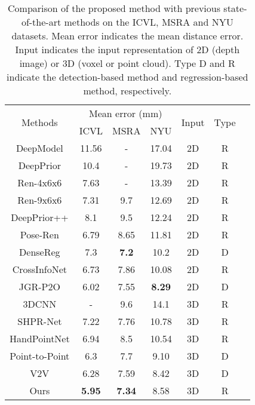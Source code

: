 \documentclass[10pt,twocolumn,letterpaper]{article}
\begin{document}
\begin{table}[h!]
\setlength\tabcolsep{5pt}\small
\begin{center}

\begin{tabular}{ccccccc}
\hline
\multirow{2}{*}{Methods} & \multicolumn{3}{c}{Mean error (mm)}& \multirow{2}{*}{Input}& \multirow{2}{*}{Type} \\
\cline{2-4}
                        & ICVL          &   MSRA        &   NYU     &   \\
\hline

DeepModel \cite{zhou2016model}       &11.56          & -            & 17.04             &2D   &R  \\
DeepPrior \cite{oberweger2015hands}  &10.4           & -            & 19.73             &2D   &R  \\
Ren-4x6x6 \cite{guo2017region}       &7.63           & -            & 13.39            &2D   &R  \\
Ren-9x6x6 \cite{wan2018dense}        &7.31           & 9.7          & 12.69           &2D   &R  \\
DeepPrior++ \cite{oberweger2017deepprior++}          &8.1           & 9.5           & 12.24           &2D   &R  \\
Pose-Ren \cite{chen2020pose}         &6.79           & 8.65         & 11.81         &2D   &R  \\
DenseReg \cite{wan2018dense}         &7.3            & \textbf{7.2} & 10.2 &2D   &D  \\
CrossInfoNet \cite{du2019crossinfonet}&6.73          & 7.86         & 10.08          &2D   &R  \\
JGR-P2O \cite{fang2020jgr}           &6.02           & 7.55         & \textbf{8.29}          &2D   &D  \\
\hline
3DCNN \cite{ge20173d}                & -             &9.6           & 14.1            &3D   &R  \\
SHPR-Net \cite{chen2018shpr}         &7.22           & 7.76         & 10.78          &3D   &R  \\
HandPointNet \cite{ge2018hand}       &6.94           & 8.5          & 10.54           &3D   &R  \\
Point-to-Point \cite{ge2018point}    &6.3            &7.7           & 9.10            &3D   &D  \\
V2V \cite{moon2018v2v}               &6.28           &7.59          & 8.42           &3D   &D  \\
\hline
Ours                                 &\textbf{5.95}  &\textbf{7.34} & 8.58  &3D   &R\\
\hline
\end{tabular}
\end{center}
\caption{Comparison of the proposed method with previous state-of-the-art methods on the ICVL, MSRA and NYU datasets. Mean error indicates the mean distance error. Input indicates the input representation of 2D (depth image) or 3D (voxel or point cloud). Type D and R indicate the detection-based method and regression-based method, respectively.}
\label{tab:sota}
\end{table}
\end{document}
